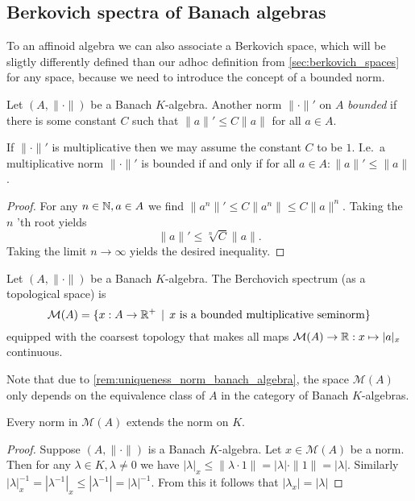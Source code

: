 \subsection{Berkovich spectra of Banach algebras} \label{sec:berkovich_spectra_of_banach_algebras}


To an affinoid algebra we can also associate a Berkovich space, which will be sligtly differently defined than our adhoc definition from \cref{sec:berkovich_spaces} for any space, because we need to introduce the concept of a bounded norm.

\begin{definition}
	Let $(A, \|\cdot \|)$ be a Banach $K$-algebra. Another norm $\|\cdot \|'$ on $A$ \emph{bounded}  if there is some constant $C$ such that  $\|a\|' \le C \|a\|$ for all $a \in A$. 
\end{definition}


\begin{remark}
	If $\|\cdot \|'$ is multiplicative then we may assume the constant $C$ to be $1$. 
	I.e.\ a multiplicative norm $\|\cdot \|'$ is bounded if and only if  for all $a \in A: \|a\|' \le \|a\|$. 
\end{remark}
\begin{proof}
	For any $n \in \mathbb{N}, a \in A$ we find $\|a^{n}\|' \le C \|a^{n}\| \le C \|a\|^{n}$. 
	Taking the $n$ 'th root yields \[
		\|a\|' \le \sqrt[n]{C} \|a\|
	.\] 
	Taking the limit $n \to \infty$ yields the desired inequality. 
\end{proof}

\begin{definition}\label{def:spectrum_banach_algebra}
	Let $(A, \|\cdot \|)$ be a Banach $K$-algebra. 
	The Berchovich spectrum (as a topological space) is \[
		\mathcal{M} (A) = \{x: A \to\R^{+} \st x \text{ is a bounded multiplicative seminorm}\} 
	\] 
	equipped with the coarsest topology that makes all maps $\mathcal{M} (A) \to \mathbb{R}: x \mapsto |a|_x$ continuous. 
\end{definition}
Note that due to \cref{rem:uniqueness_norm_banach_algebra}, the space $\mathcal{M} (A)$ only depends on the equivalence class of $A$ in the category of Banach $K$-algebras. 

\begin{proposition}\label{prop:norm_spectrum_extends_base_field}
	Every norm in $\mathcal{M} (A)$ extends the norm on $K$. 
\end{proposition}
\begin{proof}
	Suppose $(A, \|\cdot \|)$ is a Banach $K$-algebra. 
	Let $x \in \mathcal{M} (A)$ be a norm. 
	Then for any $\lambda \in K, \lambda \ne 0$ we have $|\lambda|_x \le  \|\lambda\cdot 1\| = |\lambda| \cdot \|1\| = |\lambda|$. 
	Similarly $|\lambda|_x^{-1} = |\lambda^{-1}|_x  \le |\lambda^{-1}| = |\lambda|^{-1}$. 
	From this it follows that $|\lambda_x| = |\lambda|$
\end{proof}


